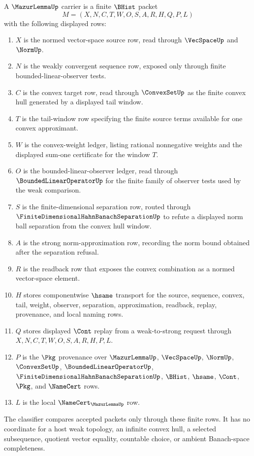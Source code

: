 \begin{definition}
\label{def:mazur-lemma-carrier}
A $\MazurLemmaUp$ carrier is a finite $\BHist$ packet
$$
M=(X,N,C,T,W,O,S,A,R,H,Q,P,L)
$$
with the following displayed rows:
\begin{enumerate}
\item $X$ is the normed vector-space source row, read through $\VecSpaceUp$ and $\NormUp$.
\item $N$ is the weakly convergent sequence row, exposed only through finite bounded-linear-observer tests.
\item $C$ is the convex target row, read through $\ConvexSetUp$ as the finite convex hull generated by a displayed tail window.
\item $T$ is the tail-window row specifying the finite source terms available for one convex approximant.
\item $W$ is the convex-weight ledger, listing rational nonnegative weights and the displayed sum-one certificate for the window $T$.
\item $O$ is the bounded-linear-observer ledger, read through $\BoundedLinearOperatorUp$ for the finite family of observer tests used by the weak comparison.
\item $S$ is the finite-dimensional separation row, routed through $\FiniteDimensionalHahnBanachSeparationUp$ to refute a displayed norm ball separation from the convex hull window.
\item $A$ is the strong norm-approximation row, recording the norm bound obtained after the separation refusal.
\item $R$ is the readback row that exposes the convex combination as a normed vector-space element.
\item $H$ stores componentwise $\hsame$ transport for the source, sequence, convex, tail, weight, observer, separation, approximation, readback, replay, provenance, and local naming rows.
\item $Q$ stores displayed $\Cont$ replay from a weak-to-strong request through $X,N,C,T,W,O,S,A,R,H,P,L$.
\item $P$ is the $\Pkg$ provenance over $\MazurLemmaUp$, $\VecSpaceUp$, $\NormUp$, $\ConvexSetUp$, $\BoundedLinearOperatorUp$, $\FiniteDimensionalHahnBanachSeparationUp$, $\BHist$, $\hsame$, $\Cont$, $\Pkg$, and $\NameCert$ rows.
\item $L$ is the local $\NameCert_{\MazurLemmaUp}$ row.
\end{enumerate}
The classifier compares accepted packets only through these finite rows. It has no coordinate for a host weak topology, an infinite convex hull, a selected subsequence, quotient vector equality, countable choice, or ambient Banach-space completeness.
\end{definition}

